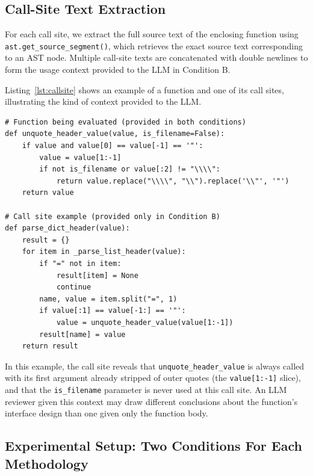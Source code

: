 \documentclass[12pt]{report}
\begin{document}
\subsection{Call-Site Text Extraction}

For each call site, we extract the full source text of the enclosing function using \texttt{ast.get\_source\_segment()}, which retrieves the exact source text corresponding to an AST node. Multiple call-site texts are concatenated with double newlines to form the usage context provided to the LLM in Condition B.

Listing~\ref{lst:callsite} shows an example of a function and one of its call sites, illustrating the kind of context provided to the LLM.

\begin{lstlisting}[caption={Example: \texttt{unquote\_header\_value} from requests and one call site from \texttt{parse\_dict\_header}.}, label={lst:callsite}]
# Function being evaluated (provided in both conditions)
def unquote_header_value(value, is_filename=False):
    if value and value[0] == value[-1] == '"':
        value = value[1:-1]
        if not is_filename or value[:2] != "\\\\":
            return value.replace("\\\\", "\\").replace('\\"', '"')
    return value

# Call site example (provided only in Condition B)
def parse_dict_header(value):
    result = {}
    for item in _parse_list_header(value):
        if "=" not in item:
            result[item] = None
            continue
        name, value = item.split("=", 1)
        if value[:1] == value[-1:] == '"':
            value = unquote_header_value(value[1:-1])
        result[name] = value
    return result
\end{lstlisting}

In this example, the call site reveals that \texttt{unquote\_header\_value} is always called with its first argument already stripped of outer quotes (the \texttt{value[1:-1]} slice), and that the \texttt{is\_filename} parameter is never used at this call site. An LLM reviewer given this context may draw different conclusions about the function's interface design than one given only the function body.

\subsection{Experimental Setup: Two Conditions For Each Methodology}
\end{document}
